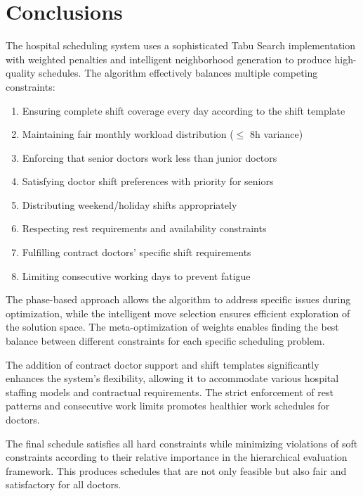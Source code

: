 \documentclass[12pt]{article}
\begin{document}
\section{Conclusions}

The hospital scheduling system uses a sophisticated Tabu Search implementation with weighted penalties and intelligent neighborhood generation to produce high-quality schedules. The algorithm effectively balances multiple competing constraints:

\begin{enumerate}
    \item Ensuring complete shift coverage every day according to the shift template
    \item Maintaining fair monthly workload distribution ($\leq$ 8h variance)
    \item Enforcing that senior doctors work less than junior doctors
    \item Satisfying doctor shift preferences with priority for seniors
    \item Distributing weekend/holiday shifts appropriately
    \item Respecting rest requirements and availability constraints
    \item Fulfilling contract doctors' specific shift requirements
    \item Limiting consecutive working days to prevent fatigue
\end{enumerate}

The phase-based approach allows the algorithm to address specific issues during optimization, while the intelligent move selection ensures efficient exploration of the solution space. The meta-optimization of weights enables finding the best balance between different constraints for each specific scheduling problem.

The addition of contract doctor support and shift templates significantly enhances the system's flexibility, allowing it to accommodate various hospital staffing models and contractual requirements. The strict enforcement of rest patterns and consecutive work limits promotes healthier work schedules for doctors.

The final schedule satisfies all hard constraints while minimizing violations of soft constraints according to their relative importance in the hierarchical evaluation framework. This produces schedules that are not only feasible but also fair and satisfactory for all doctors.
\end{document}
